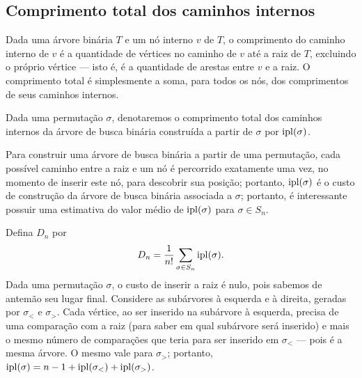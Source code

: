 \subsection{Comprimento total dos caminhos internos}

\begin{definition}
    Dada uma árvore binária $T$ e um nó interno $v$ de $T$,
    o comprimento do caminho interno de $v$
    é a quantidade de vértices no caminho de $v$ até a raiz de $T$,
    excluindo o próprio vértice
    --- isto é, é a quantidade de arestas entre $v$ e a raiz.
    O comprimento total é simplesmente a soma,
    para todos os nós,
    dos comprimentos de seus caminhos internos.
    \cite[p.~272]{SedgewickFlajolet2013}
\end{definition}

Dada uma permutação $\sigma$,
denotaremos o comprimento total dos caminhos internos
da árvore de busca binária construída a partir de $\sigma$ por $\operatorname{ipl}(\sigma)$.

Para construir uma árvore de busca binária a partir de uma permutação,
cada possível caminho entre a raiz e um nó é percorrido exatamente uma vez,
no momento de inserir este nó,
para descobrir sua posição;
portanto,
$\operatorname{ipl}(\sigma)$ é o custo de construção da árvore de busca binária associada a $\sigma$;
portanto,
é interessante possuir uma estimativa do valor médio de $\operatorname{ipl}(\sigma)$
para $\sigma \in S_n$.

Defina $D_n$ por
\begin{equation*}
    D_n = \frac{1}{n!} \sum_{\sigma \in S_n} \operatorname{ipl}(\sigma).
\end{equation*}
Dada uma permutação $\sigma$,
o custo de inserir a raiz é nulo,
pois sabemos de antemão seu lugar final.
Considere as subárvores à esquerda e à direita,
geradas por $\sigma_<$ e $\sigma_>$.
Cada vértice, ao ser inserido na subárvore à esquerda,
precisa de uma comparação com a raiz (para saber em qual subárvore será inserido)
e mais o mesmo número de comparações que teria para ser inserido em $\sigma_<$
--- pois é a mesma árvore.
O mesmo vale para $\sigma_>$;
portanto, $\operatorname{ipl}(\sigma) = n-1 + \operatorname{ipl}(\sigma_<) + \operatorname{ipl}(\sigma_>)$.

